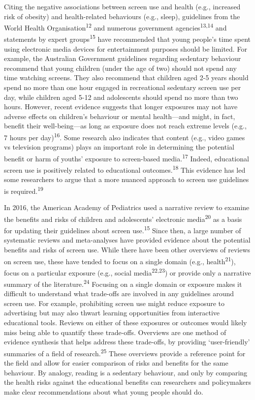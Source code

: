 \documentclass[
  english,
  man]{apa6}
\begin{document}
Citing the negative associations between screen use and health (e.g., increased risk of obesity) and health-related behaviours (e.g., sleep), guidelines from the World Health Organisation\textsuperscript{12} and numerous government agencies\textsuperscript{13,14} and statements by expert groups\textsuperscript{15} have recommended that young people's time spent using electronic media devices for entertainment purposes should be limited.
For example, the Australian Government guidelines regarding sedentary behaviour recommend that young children (under the age of two) should not spend any time watching screens.
They also recommend that children aged 2-5 years should spend no more than one hour engaged in recreational sedentary screen use per day, while children aged 5-12 and adolescents should spend no more than two hours.
However, recent evidence suggests that longer exposures may not have adverse effects on children's behaviour or mental health---and might, in fact, benefit their well-being---as long as exposure does not reach extreme levels (e.g., 7 hours per day)\textsuperscript{16}.
Some research also indicates that content (e.g., video games vs television programs) plays an important role in determining the potential benefit or harm of youths' exposure to screen-based media.\textsuperscript{17}
Indeed, educational screen use is positively related to educational outcomes.\textsuperscript{18}
This evidence has led some researchers to argue that a more nuanced approach to screen use guidelines is required.\textsuperscript{19}

In 2016, the American Academy of Pediatrics used a narrative review to examine the benefits and risks of children and adolescents' electronic media\textsuperscript{20} as a basis for updating their guidelines about screen use.\textsuperscript{15}
Since then, a large number of systematic reviews and meta-analyses have provided evidence about the potential benefits and risks of screen use.
While there have been other overviews of reviews on screen use, these have tended to focus on a single domain (e.g., health\textsuperscript{21}), focus on a particular exposure (e.g., social media\textsuperscript{22,23}) or provide only a narrative summary of the literature.\textsuperscript{24}
Focusing on a single domain or exposure makes it difficult to understand what trade-offs are involved in any guidelines around screen use.
For example, prohibiting screen use might reduce exposure to advertising but may also thwart learning opportunities from interactive educational tools.
Reviews on either of these exposures or outcomes would likely miss being able to quantify these trade-offs.
Overviews are one method of evidence synthesis that helps address these trade-offs, by providing `user-friendly' summaries of a field of research.\textsuperscript{25}
These overviews provide a reference point for the field and allow for easier comparison of risks and benefits for the same behaviour.
By analogy, reading is a sedentary behaviour, and only by comparing the health risks against the educational benefits can researchers and policymakers make clear recommendations about what young people should do.
\end{document}
